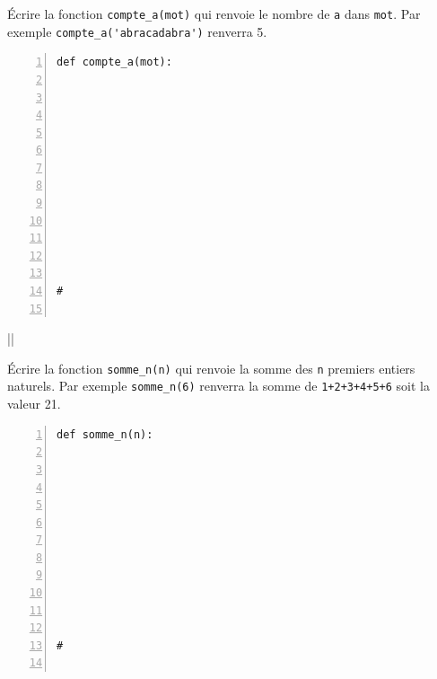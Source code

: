 \documentclass[a4paper,12pt,openany]{book}
\begin{document}
	
	
	
	
\exo

\begin{minipage}{8.5cm}
Écrire la fonction \verb+compte_a(mot)+ qui renvoie le nombre de \verb+a+ dans \verb+mot+. Par exemple \verb+compte_a('abracadabra')+ renverra 5.

\begin{lstlisting}[numbers=left]
def compte_a(mot):












#
		
\end{lstlisting}
\end{minipage}
\begin{minipage}{1cm}
||
\end{minipage}
\begin{minipage}{8.5cm}
Écrire la fonction \verb+somme_n(n)+ qui renvoie la somme des \verb+n+ premiers entiers naturels. Par exemple \verb+somme_n(6)+ renverra la somme de \verb-1+2+3+4+5+6- soit la valeur 21.

\begin{lstlisting}[numbers=left]
def somme_n(n):











#
		
\end{lstlisting}
\end{minipage}
\newpage
\end{document}
